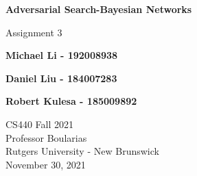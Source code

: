 \documentclass[11pt]{article}
\begin{document}
    \begin{titlepage}
        \begin{center}
            \vspace{1cm}

            \Huge
            \textbf{Adversarial Search-Bayesian Networks}

            \vspace{0.5cm}
            \LARGE
            Assignment 3

            \vspace{1cm}

            \textbf{Michael Li - 192008938}

            \textbf{Daniel Liu - 184007283}

            \textbf{Robert Kulesa - 185009892}


            \vfill


            \vspace{0.8cm}

            \Large
            CS440 Fall 2021\\
            Professor Boularias\\
            Rutgers University - New Brunswick\\
            November 30, 2021

        \end{center}
    \end{titlepage}
\end{document}
